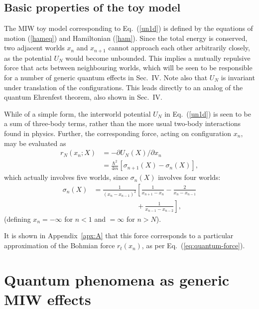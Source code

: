 \documentclass[12pt, aps,pra,amsmath,amssymb,superscriptaddress]{revtex4-2}
\newcommand{\nn}{\nonumber}
\renewcommand{\(}{\left(}
\renewcommand{\)}{\right)}
\newcommand{\red}{\color{red}}
\newcommand{\blk}{\color{black}}
\newcommand{\blu}{\color{blue}}
\renewcommand\blu{\blk}
\renewcommand\red{\blk}
\begin{document}
\subsection{Basic properties of the toy model}\label{sec:prop}

The MIW toy model corresponding to Eq.~(\ref{un1d}) is defined by the equations
of motion (\ref{hameq}) and Hamiltonian (\ref{ham}).  Since the total energy is
conserved, two adjacent worlds $x_n$ and $x_{n+1}$ cannot approach each other
arbitrarily closely, as the potential $U_N$ would become unbounded. This implies
a mutually repulsive force that acts between neighbouring worlds, \blk
which will be seen to be responsible for a number of generic quantum effects in
Sec.~IV.   Note also that $U_N$ is invariant under translation of the
configurations.  This leads directly to an analog of the quantum Ehrenfest
theorem, also shown in Sec.~IV. 

While of a simple form, the interworld potential $U_N$ in Eq.~(\ref{un1d}) is seen to be a sum of three-body terms, rather than the more usual two-body interactions found in physics.    Further, the corresponding force,  acting on configuration $x_n$, may be evaluated as 
\begin{align}
{r}_N({x_n};{X}) &= -\partial U_N({X})/\partial x_n \nn \\
& = \frac{\hbar^2}{4m} [\sigma_{n+1}({X}) - \sigma_n({X})],  \label{hamforce}
\end{align}
\red which actually involves five worlds, since $\sigma_n({X})$ \blk involves \blu four \blk worlds:  
\begin{align}
\sigma_n({X}) &= \frac{1}{(x_{n}-x_{n-1})^2}\left[ \frac{1}{x_{n+1}-x_{n}} - \frac{2}{x_{n}-x_{n-1}} \right. \nn \\ 
&~~~~~~~~~~~~~~~~~~~~~~~~~~~~~\left. 
+\, \frac{1}{x_{n-1}-x_{n-2}}\right] , \label{sigmaforce}
\end{align}\blk 
(defining $x_n=-\infty$ for $n<1$ and $=\infty$ for $n>N$). 


\blk It is shown in
Appendix~\ref{apx:A} that this force corresponds to a particular approximation of the
Bohmian force $r_t(x_n)$, as per Eq.~(\ref{eq:quantum-force}).  



\section{Quantum phenomena as generic MIW effects}\label{sec:phenomena}
\end{document}
